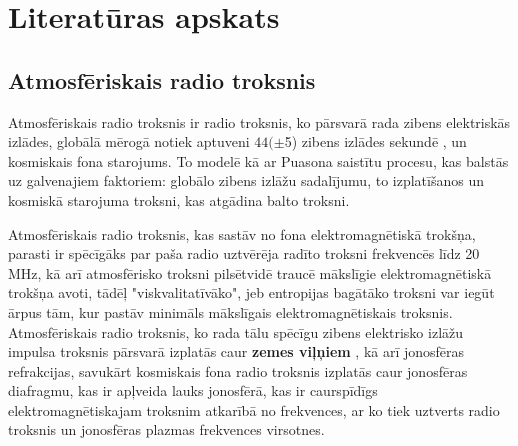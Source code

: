 \documentclass[12pt]{article}
\begin{document}
       
       
	
	\pagebreak
	\section{Literatūras apskats}
    
   
    \subsection{Atmosfēriskais radio troksnis}
    Atmosfēriskais radio troksnis ir radio troksnis, ko pārsvarā rada zibens elektriskās izlādes, globālā mērogā notiek aptuveni $44 (\pm $5) zibens izlādes sekundē \parencite{zibens}, un kosmiskais fona starojums. To  modelē kā ar Puasona saistītu procesu, kas balstās uz galvenajiem faktoriem: globālo zibens izlāžu sadalījumu, to izplatīšanos un kosmiskā starojuma troksni, kas atgādina balto troksni. \parencite{atmosf_modelis} 
    \par Atmosfēriskais radio troksnis, kas sastāv no fona elektromagnētiskā trokšņa, parasti ir spēcīgāks par paša radio uztvērēja radīto troksni frekvencēs līdz 20 MHz, kā arī atmosfērisko troksni pilsētvidē traucē mākslīgie elektromagnētiskā trokšņa avoti, tādēļ "viskvalitatīvāko", jeb entropijas bagātāko troksni var iegūt ārpus tām, kur pastāv minimāls mākslīgais elektromagnētiskais troksnis. \parencite{atdalisanas}
    Atmosfēriskais radio troksnis, ko rada tālu spēcīgu zibens elektrisko izlāžu impulsa troksnis pārsvarā izplatās caur \textbf{zemes viļņiem} \parencite{zibens2}, kā arī jonosfēras refrakcijas, savukārt kosmiskais fona radio troksnis izplatās caur jonosfēras diafragmu, kas ir apļveida lauks jonosfērā, kas ir caurspīdīgs elektromagnētiskajam troksnim atkarībā no frekvences, ar ko tiek uztverts radio troksnis un jonosfēras plazmas frekvences virsotnes. \parencite{zibens3} 
\end{document}
